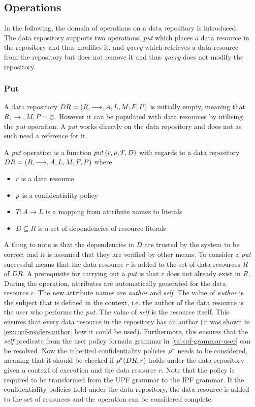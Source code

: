 \subsection{Operations}
In the following, the domain of operations on a data repository is introduced. The data repository supports two operations, \emph{put} which places a data resource in the repository and thus modifies it, and \emph{query} which retrieves a data resource from the repository but does not remove it and thus \emph{query} does not modify the repository.

\subsubsection{Put}\label{sec:put}
A data repository $DR= \left( R, \longrightarrow, A, L, M, F, P \right)$ is initially empty, meaning that $R, \longrightarrow, M, P = \varnothing$. However it can be populated with data resources by utilising the \emph{put} operation. A \emph{put} works directly on the data repository and does not as such need a reference for it.
\begin{definition}
A \emph{put} operation is a function $put \left( r, \rho, T, D \right)$ with regards to a data repository $DR= \left( R, \longrightarrow, A, L, M, F, P \right)$ where
\begin{itemize}
  \item $r$ is a data resource
  \item $\rho$ is a confidentiality policy
  \item $T : A \rightarrow L$ is a mapping from attribute names to literals
  \item $D \subseteq R$ is a set of dependencies of resource literals
\end{itemize}
\end{definition}
A thing to note is that the dependencies in $D$ are trusted by the system to be correct and it is assumed that they are verified by other means. To consider a \emph{put} successful means that the data resource $r$ is added to the set of data resources $R$ of $DR$. A prerequisite for carrying out a \emph{put} is that $r$ does not already exist in $R$. During the operation, attributes are automatically generated for the data resource $r$. The new attribute names are \emph{author} and \emph{self}. The value of \emph{author} is the subject that is defined in the context, i.e. the author of the data resource is the user who performs the \emph{put}. The value of \emph{self} is the resource itself. This ensures that every data resource in the repository has an author (it was shown in \autoref{ex:conf-reader-author} how it could be used). Furthermore, this ensures that the \emph{self} predicate from the user policy formula grammar in \autoref{tab:pf-grammar-user} can be resolved. Now the inherited confidentiality policies $\rho^{\ast}$ needs to be considered, meaning that it should be checked if $\rho^{\ast}(DR,r)$ holds under the data repository given a context of execution and the data resource $r$. Note that the policy is required to be transformed from the UPF grammar to the IPF grammar. If the confidentiality policies hold under the data repository, the data resource is added to the set of resources and the operation can be considered complete.
